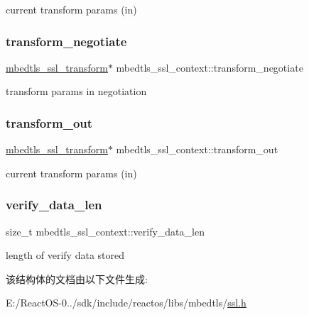 current transform params (in) \mbox{\label{structmbedtls__ssl__context_adce09e981f24eb615a5450194750deb7}} 
\subsubsection{\texorpdfstring{transform\+\_\+negotiate}{transform\_negotiate}}
{\footnotesize\ttfamily \hyperlink{structmbedtls__ssl__transform}{mbedtls\+\_\+ssl\+\_\+transform}$\ast$ mbedtls\+\_\+ssl\+\_\+context\+::transform\+\_\+negotiate}

transform params in negotiation \mbox{\label{structmbedtls__ssl__context_a06e77983fa7ce4de0ffcd9ae8a038cdf}} 
\subsubsection{\texorpdfstring{transform\+\_\+out}{transform\_out}}
{\footnotesize\ttfamily \hyperlink{structmbedtls__ssl__transform}{mbedtls\+\_\+ssl\+\_\+transform}$\ast$ mbedtls\+\_\+ssl\+\_\+context\+::transform\+\_\+out}

current transform params (in) \mbox{\label{structmbedtls__ssl__context_a06b667bf3672f8d480f962970c5adc7d}} 
\subsubsection{\texorpdfstring{verify\+\_\+data\+\_\+len}{verify\_data\_len}}
{\footnotesize\ttfamily size\+\_\+t mbedtls\+\_\+ssl\+\_\+context\+::verify\+\_\+data\+\_\+len}

length of verify data stored 

该结构体的文档由以下文件生成\+:\begin{DoxyCompactItemize}
\item 
E\+:/\+React\+O\+S-\/0../sdk/include/reactos/libs/mbedtls/\hyperlink{ssl_8h}{ssl.\+h}\end{DoxyCompactItemize}
